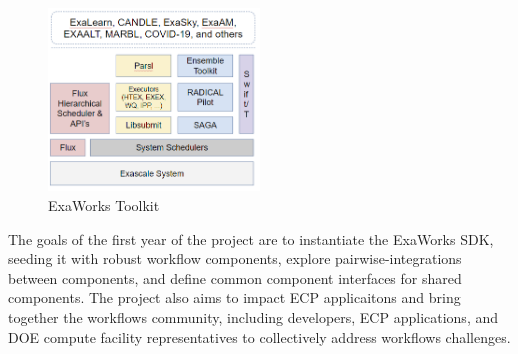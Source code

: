 \begin{figure}
\begin{center}
    \includegraphics[width=0.5\textwidth]{projects/2.3.5-Ecosystem/2.3.5.10-ExaWorks/exaworks.png}
  \end{center}
  \caption{ExaWorks Toolkit\label{fig:arch}}
\end{figure} 

The goals of the first year of the project are to instantiate the ExaWorks SDK, seeding it with
robust workflow components, explore pairwise-integrations between components, and define
common component interfaces for shared components.  The project also aims to impact ECP applicaitons and 
bring together the workflows community, including developers, ECP applications, and DOE compute facility representatives
to collectively address workflows challenges.

